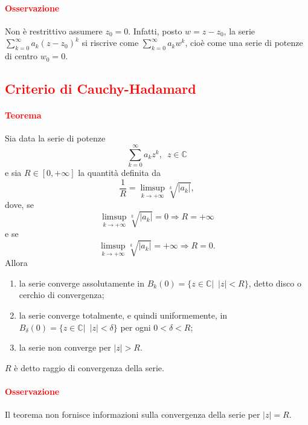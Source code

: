 \documentclass{article}
\newcommand{\C}{\mathbb{C}}
\begin{document}
\paragraph{\textcolor{red}{Osservazione}}
Non è restrittivo assumere $z_0=0$. Infatti, posto $w=z-z_0$, la serie $\sum_{k=0}^{\infty} a_k(z-z_0)^k$ si riscrive come $\sum_{k=0}^{\infty} a_k w^k$, cioè come una serie di potenze di centro $w_0=0$.

\subsection{\textcolor{red}{Criterio di Cauchy-Hadamard}}
\paragraph{\textcolor{red}{Teorema}}
Sia data la serie di potenze
\begin{equation*}
    \sum_{k=0}^{\infty} a_kz^k,\,\,\, z \in \C
\end{equation*}
e sia $R\in [0,+\infty]$ la quantità definita da 
\begin{equation*}
    \frac{1}{R}=\limsup_{k \rightarrow+\infty} \sqrt[k]{|a_k|},
\end{equation*}
dove, se
\begin{equation*}
    \limsup_{k \rightarrow+\infty} \sqrt[k]{|a_k|} =0 \Rightarrow R=+\infty
\end{equation*}
e se
\begin{equation*}
    \limsup_{k \rightarrow+\infty} \sqrt[k]{|a_k|} =+\infty \Rightarrow R=0.
\end{equation*}
Allora
\begin{enumerate}
    \item la serie converge assolutamente in $B_k(0)=\{z\in\C|\,\,\,|z|<R\}$, detto disco o cerchio di convergenza;
    \item la serie converge totalmente, e quindi uniformemente, in $B_\delta (0)=\{z \in \C|\,\,\,|z|< \delta\}$ per ogni $0< \delta < R$;
    \item la serie non converge per $|z|>R$.
\end{enumerate}
$R$ è detto raggio di convergenza della serie.

\paragraph{\textcolor{red}{Osservazione}}
Il teorema non fornisce informazioni sulla convergenza della serie per $|z|=R$.
\end{document}
